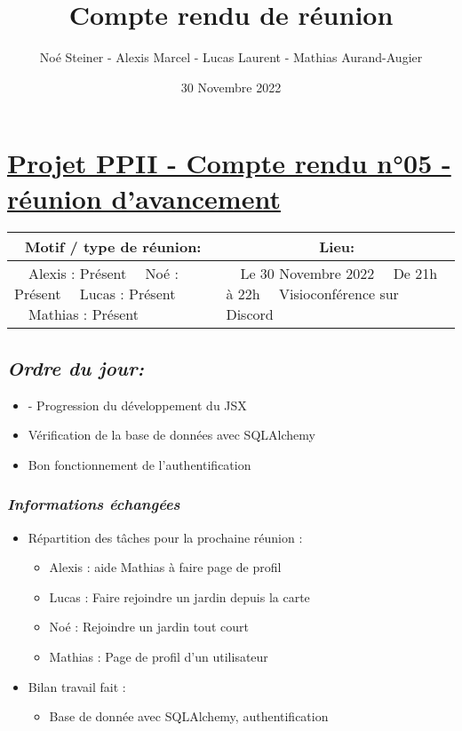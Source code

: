 \documentclass[french,a4paper]{article}
\author{Noé Steiner - Alexis Marcel - Lucas Laurent - Mathias Aurand-Augier}
\date{30 Novembre 2022}
\newcommand{\tabitem}{\textbullet~~}\title{Compte rendu de réunion}
\begin{document}
\maketitle

\section*{\underline{Projet PPII - Compte rendu n°05 - réunion d'avancement}}

\begin{table}[!htb]
  \centering
  \begin{tabular}{| p{7cm} | p{7cm} |}
    \hline
    \multicolumn{1}{|c|}{ Motif / type de réunion:} & \multicolumn{1}{c|}{Lieu:} \\
    \hline
    \tabitem Alexis : Présent\newline
    \tabitem Noé : Présent\newline
    \tabitem Lucas : Présent\newline
    \tabitem Mathias : Présent                      &
    \tabitem Le 30 Novembre 2022\newline
    \tabitem De 21h à 22h\newline
    \tabitem Visioconférence sur Discord                                         \\
    \hline
  \end{tabular}
\end{table}

\subsection*{\textit{Ordre du jour:}}

\begin{itemize}
  \item - Progression du développement du JSX
  \item Vérification de la base de données avec SQLAlchemy
  \item Bon fonctionnement de l’authentification
\end{itemize}

\subsubsection*{\textit{Informations échangées}}
\begin{itemize}
  \item Répartition des tâches pour la prochaine réunion :
    \begin{itemize}
      \item Alexis : aide Mathias à faire page de profil
      \item Lucas : Faire rejoindre un jardin depuis la carte
      \item Noé : Rejoindre un jardin tout court
      \item Mathias : Page de profil d'un utilisateur
    \end{itemize}
  \item Bilan travail fait : 
    \begin{itemize}
      \item Base de donnée avec SQLAlchemy, authentification
    \end{itemize}
\end{itemize}
\end{document}
